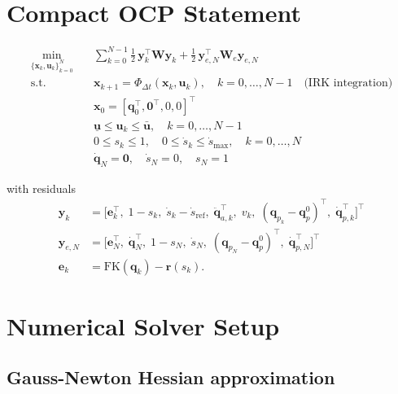 \documentclass[11pt, a4paper]{article}
\newcommand{\qd}{\bm{q}}          %
\newcommand{\dqd}{\dot{\bm{q}}}   %
\newcommand{\qp}{\bm{q}_p}        %
\newcommand{\FK}{\mathrm{FK}}
\begin{document}
\section{Compact OCP Statement}

\begin{equation}
  \boxed{
  \begin{aligned}
    \min_{\{\bm{x}_k,\bm{u}_k\}_{k=0}^{N}}
    \quad & \sum_{k=0}^{N-1} \tfrac{1}{2}\,\bm{y}_k^\top \bm{W} \bm{y}_k
           + \tfrac{1}{2}\,\bm{y}_{e,N}^\top \bm{W}_e \bm{y}_{e,N} \\[4pt]
    \text{s.t.} \quad
    & \bm{x}_{k+1} = \Phi_{\Delta t}(\bm{x}_k, \bm{u}_k),
      \quad k = 0,\dots,N-1 \quad \text{(IRK integration)} \\
    & \bm{x}_0 = [\qd_0^\top,\bm{0}^\top,0,0]^\top \\
    & \underline{\bm{u}} \leq \bm{u}_k \leq \bar{\bm{u}},
      \quad k = 0,\dots,N-1 \\
    & 0 \leq s_k \leq 1,\quad 0 \leq \dot{s}_k \leq \dot{s}_\mathrm{max},
      \quad k = 0,\dots,N \\
    & \dqd_N = \bm{0},\quad \dot{s}_N = 0,\quad s_N = 1
  \end{aligned}
  }
  \label{eq:ocp}
\end{equation}

with residuals
\begin{align}
  \bm{y}_k &= \bigl[\bm{e}_k^\top,\;1-s_k,\;\dot{s}_k - \dot{s}_\mathrm{ref},\;
               \ddot{\bm{q}}_{a,k}^\top,\;v_k,\;(\qp_k - \qp^0)^\top,\;\dqd_{p,k}^\top
               \bigr]^\top \\[4pt]
  \bm{y}_{e,N} &= \bigl[\bm{e}_N^\top,\;\dqd_N^\top,\;1-s_N,\;\dot{s}_N,\;
                  (\qp_N-\qp^0)^\top,\;\dqd_{p,N}^\top\bigr]^\top \\[4pt]
  \bm{e}_k &= \FK(\qd_k) - \bm{r}(s_k).
\end{align}

\section{Numerical Solver Setup}

\subsection{Gauss-Newton Hessian approximation}
\end{document}
